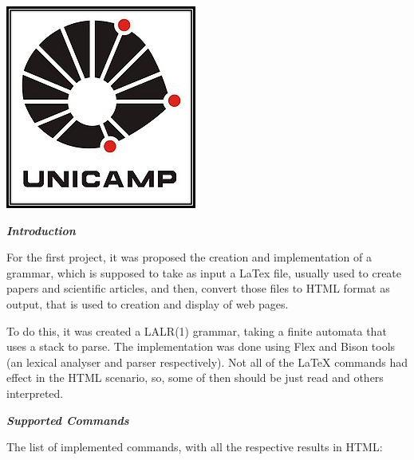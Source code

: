 \documentclass{article}
\begin{document}
\includegraphics{unicamp.jpg}

\textbf{\textit{Introduction}}

For the first project, it was proposed the creation and implementation of a grammar, which is supposed to take as input a LaTex file, usually used to create papers and scientific articles, and then, convert those files to HTML format as output, that is used to creation and display of web pages.

To do this, it was created a LALR(1) grammar, taking a finite automata that uses a stack to parse. The implementation was done using Flex and Bison tools (an lexical analyser and parser respectively). Not all of the LaTeX commands had effect in the HTML scenario, so, some of then should be just read and others interpreted.

\textit{\textbf{Supported Commands}}

The list of implemented commands, with all the respective results in HTML:
\end{document}
